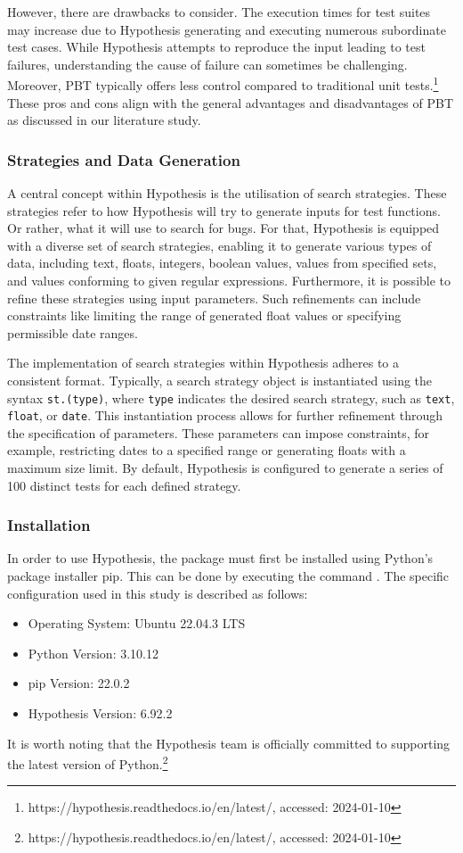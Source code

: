\documentclass[runningheads]{llncs}
\begin{document}
However, there are drawbacks to consider. The execution times for test suites may increase due to Hypothesis generating and executing numerous subordinate test cases. While Hypothesis attempts to reproduce the input leading to test failures, understanding the cause of failure can sometimes be challenging. Moreover, PBT typically offers less control compared to traditional unit tests.\footnote{https://hypothesis.readthedocs.io/en/latest/, accessed: 2024-01-10} These pros and cons align with the general advantages and disadvantages of PBT as discussed in our literature study.

\subsubsection{Strategies and Data Generation}
A central concept within Hypothesis is the utilisation of search strategies. These strategies refer to how Hypothesis will try to generate inputs for test functions. Or rather, what it will use to search for bugs. For that, Hypothesis is equipped with a diverse set of search strategies, enabling it to generate various types of data, including text, floats, integers, boolean values, values from specified sets, and values conforming to given regular expressions. Furthermore, it is possible to refine these strategies using input parameters. Such refinements can include constraints like limiting the range of generated float values or specifying permissible date ranges.

The implementation of search strategies within Hypothesis adheres to a consistent format. Typically, a search strategy object is instantiated using the syntax \texttt{st.(type)}, where \texttt{type} indicates the desired search strategy, such as \texttt{text}, \texttt{float}, or \texttt{date}. This instantiation process allows for further refinement through the specification of parameters. These parameters can impose constraints, for example, restricting dates to a specified range or generating floats with a maximum size limit. By default, Hypothesis is configured to generate a series of 100 distinct tests for each defined strategy.

\subsubsection{Installation}
In order to use Hypothesis, the package must first be installed using Python's package installer pip. This can be done by executing the command . The specific configuration used in this study is described as follows:
\begin{itemize}
  \item Operating System: Ubuntu 22.04.3 LTS
  \item Python Version: 3.10.12
  \item pip Version: 22.0.2
  \item Hypothesis Version: 6.92.2
\end{itemize}
It is worth noting that the Hypothesis team is officially committed to supporting the latest version of Python.\footnote{https://hypothesis.readthedocs.io/en/latest/, accessed: 2024-01-10}
\end{document}
